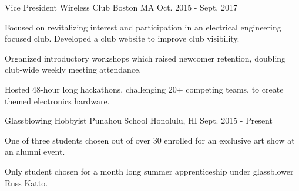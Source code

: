 

\begin{cventries}

  \cventry
    {Vice President} %
    {Wireless Club} %
    {Boston MA} %
    {Oct. 2015 - Sept. 2017} %
    {
      \begin{cvitems} %
        \item {Focused on revitalizing interest and participation in an electrical engineering focused club. Developed a club website to improve club visibility.}
        \item {Organized introductory workshops which raised newcomer retention, doubling club-wide weekly meeting attendance.}
        \item {Hosted 48-hour long hackathons, challenging 20+ competing teams, to create themed electronics hardware.}
      \end{cvitems}
    }
    
    \cventry
    {Glassblowing Hobbyist} %
    {Punahou School} %
    {Honolulu, HI} %
    {Sept. 2015 - Present} %
    {
      \begin{cvitems} %
        \item {One of three students chosen out of over 30 enrolled for an exclusive art show at an alumni event.}
        \item {Only student chosen for a month long summer apprenticeship under glassblower Russ Katto.}
      \end{cvitems}
    }

\end{cventries}
